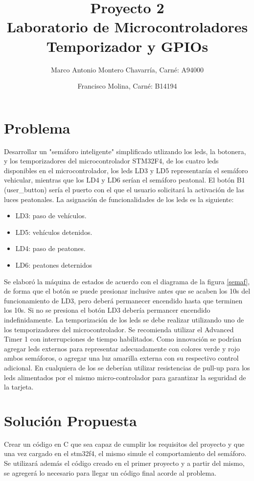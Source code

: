 \documentclass[letterpaper]{article}
\title{Proyecto 2\\ Laboratorio de Microcontroladores Temporizador y GPIOs }
\author{
Marco Antonio Montero Chavarría, Carné: A94000\\
 \and
Francisco Molina, Carné: B14194\\
}
\begin{document}
\maketitle
\section{Problema}
 Desarrollar un "semáforo inteligente" simplificado utlizando los leds, la botonera, y los temporizadores del microcontrolador STM32F4, de los cuatro leds disponibles en el microcontrolador, los leds LD3 y LD5 representarán el semáforo vehicular, mientras que los LD4 y LD6 serían el semáforo peatonal. El botón B1 (user\_button) sería el puerto con el que el usuario solicitará la activación de las luces peatonales.
La asignación de funcionalidades de los leds es la siguiente:

\begin{itemize}
\item LD3: paso de vehículos.
\item LD5: vehículos detenidos.
\item LD4: paso de peatones.
\item LD6: peatones deternidos
\end{itemize}

Se elaboró la máquina de estados de acuerdo con el diagrama de la figura \ref{semaf}, de forma que  el botón se puede presionar inclusive antes que se acaben los 10s  del funcionamiento de LD3, pero deberá permanecer encendido hasta que terminen los 10s. Si no se presiona el botón LD3 debería permancer encendido indefinidamente. 
La temporización de los leds se debe realizar utilizando uno de los temporizadores del microcontrolador.
Se recomienda utilizar el Advanced Timer 1 con interrupciones de tiempo habilitados.
Como innovación se podrían agregar leds externos para representar adecuadamente con colores verde y rojo ambos semáforos, o agregar una luz amarilla externa con su respectivo control adicional. En cualquiera de los se deberían utilizar resistencias de pull-up para los leds alimentados por el mismo micro-controlador para garantizar la seguridad de la tarjeta.

\section{Solución Propuesta}

Crear un código en C que sea capaz de cumplir los requisitos del proyecto y que una vez cargado en el stm32f4, el mismo simule el comportamiento del semáforo. Se utilizará además el código creado en el primer proyecto y a partir del mismo, se agregerá lo necesario para llegar un código final acorde al problema.
\end{document}

